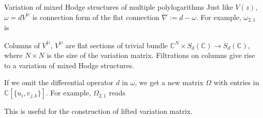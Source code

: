 \documentclass[8pt]{beamer}
\theoremstyle{definition}
\theoremstyle{remark}
\begin{document}
\begin{frame}[t]{Variation of mixed Hodge structures of multiple polylogarithms}
Just like $V(z)$, $\omega=dV^{\mathbb H}$ is connection form of the flat connection $\nabla:=d-\omega$. For example, $\omega_{2,1}$ is
\begin{center}
\end{center}
Columns of $V^{\overline{\mathbb H}}$, $V^{\mathbb H}$ are flat sections of trivial bundle $\mathbb C^N\times S_d(\mathbb C)\to S_d(\mathbb C)$, where $N\times N$ is the size of the variation matrix. Filtrations on columns give rise to a variation of mixed Hodge structures.
\vspace{10pt}

If we omit the differential operator $d$ in $\omega$, we get a new matrix $\Omega$ with entries in $\mathbb C[\{u_i,v_{j,k}\}]$. For example, $\Omega_{2,1}$ reads
\begin{center}
\end{center}
This is useful for the construction of lifted variation matrix.
\end{frame}
\end{document}
